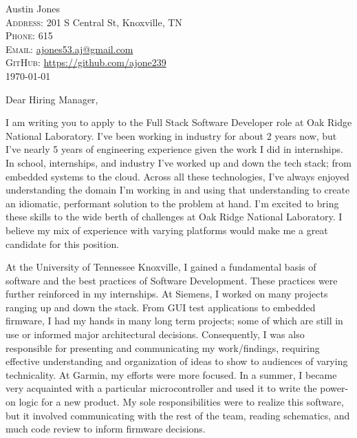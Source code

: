 \documentclass[a4paper,12pt]{article}
\newcommand{\position}{Full Stack Software Developer}
\newcommand{\company}{Oak Ridge National Laboratory}
\begin{document}
\pagestyle{empty} %


\Huge Austin Jones\smallskip{} \\
\small \textsc{Address:} 201 S Central St, Knoxville, TN \\
\small \textsc{Phone:} 615 \\
\textsc{Email:} \href{mailto:ajones53.aj@gmail.com}{ajones53.aj@gmail.com} \\
\textsc{GitHub:} \href{https://github.com/ajone239}{https://github.com/ajone239} \\

\today

Dear Hiring Manager,

I am writing you to apply to the \position{} role at \company{}.
I've been working in industry for about 2 years now, but I've nearly 5 years of engineering experience given the work I did in internships.
In school, internships, and industry I've worked up and down the tech stack; from embedded systems to the cloud.
Across all these technologies, I've always enjoyed understanding the domain I'm working in and using that understanding to create an idiomatic, performant solution to the problem at hand.
I'm excited to bring these skills to the wide berth of challenges at \company{}.
I believe my mix of experience with varying platforms would make me a great candidate for this position.

At the University of Tennessee Knoxville, I gained a fundamental basis of software and the best practices of Software Development.
These practices were further reinforced in my internships.
At Siemens, I worked on many projects ranging up and down the stack.
From GUI test applications to embedded firmware, I had my hands in many long term projects; some of which are still in use or informed major architectural decisions.
Consequently, I was also responsible for presenting and communicating my work/findings, requiring effective understanding and organization of ideas to show to audiences of varying technicality.
At Garmin, my efforts were more focused.
In a summer, I became very acquainted with a particular microcontroller and used it to write the power-on logic for a new product.
My sole responsibilities were to realize this software, but it involved communicating with the rest of the team, reading schematics, and much code review to inform firmware decisions.
\end{document}
